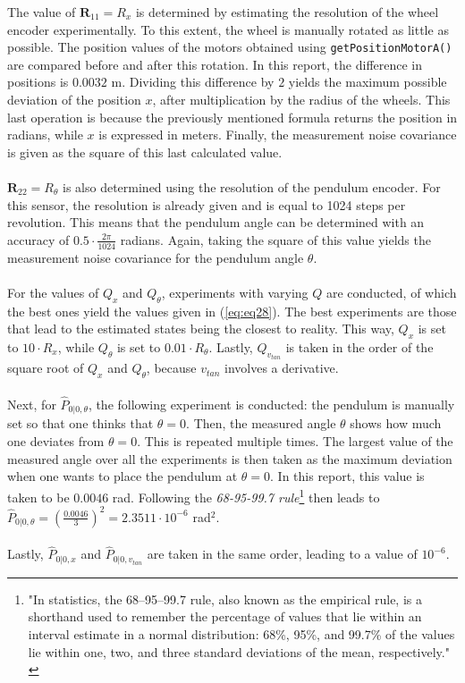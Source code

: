 \documentclass[a4paper,kul]{kulakarticle} %
\begin{document}
\noindent The value of $\mathbf{R}_{11} = R_x$ is determined by estimating the resolution of the wheel encoder experimentally. To this extent, the wheel is manually rotated as little as possible. The position values of the motors obtained using \texttt{getPositionMotorA()} are compared before and after this rotation. In this report, the difference in positions is $0.0032$ m. Dividing this difference by $2$ yields the maximum possible deviation of the position $x$, after multiplication by the radius of the wheels.  This last operation is because the previously mentioned formula returns the position in radians, while $x$ is expressed in meters. Finally, the measurement noise covariance is given as the square of this last calculated value.
\\\\
$\mathbf{R}_{22} = R_\theta$ is also determined using the resolution of the pendulum encoder. For this sensor, the resolution is already given and is equal to 1024 steps per revolution. This means that the pendulum angle can be determined with an accuracy of $0.5\cdot\frac{2\pi}{1024}$ radians. Again, taking the square of this value yields the measurement noise covariance for the pendulum angle $\theta$. 
\\\\
For the values of $Q_x$ and $Q_\theta$, experiments with varying $Q$ are conducted, of which the best ones yield the values given in (\ref{eq:eq28}). The best experiments are those that lead to the estimated states being the closest to reality. This way, $Q_x$ is set to $10\cdot R_x$, while $Q_\theta$ is set to $0.01 \cdot R_\theta$. Lastly, $Q_{v_{tan}}$ is taken in the order of the square root of $Q_x$ and $Q_\theta$, because $v_{tan}$ involves a derivative.
\\\\
Next, for $\hat{P}_{0|0, \theta}$, the following experiment is conducted: the pendulum is manually set so that one thinks that $\theta = 0$. Then, the measured angle $\theta$ shows how much one deviates from $\theta = 0$. This is repeated multiple times. The largest value of the measured angle over all the experiments is then taken as the maximum deviation when one wants to place the pendulum at $\theta = 0$. In this report, this value is taken to be $0.0046$ rad. Following the \textit{68-95-99.7 rule}\footnote{"In statistics, the 68–95–99.7 rule, also known as the empirical rule, is a shorthand used to remember the percentage of values that lie within an interval estimate in a normal distribution: 68\%, 95\%, and 99.7\% of the values lie within one, two, and three standard deviations of the mean, respectively." \cite{68rule}} then leads to $\hat{P}_{0|0, \theta} = \left(\frac{0.0046}{3}\right)^2 = 2.3511\cdot 10^{-6}$ rad$^2$.
\\\\
Lastly, $\hat{P}_{0|0, x}$ and $\hat{P}_{0|0, v_{tan}}$ are taken in the same order, leading to a value of $10^{-6}$.
\end{document}
